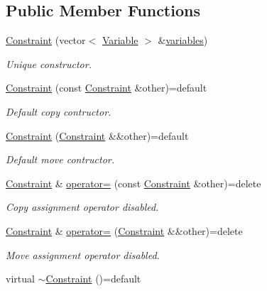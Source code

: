 \subsection*{Public Member Functions}
\begin{DoxyCompactItemize}
\item 
\hyperlink{classghost_1_1Constraint_a5aff0899e4c035709f2198b37d269e3b}{Constraint} (vector$<$ \hyperlink{classghost_1_1Variable}{Variable} $>$ \&\hyperlink{classghost_1_1Constraint_aff0c784579a9d69524be3dc9c0068302}{variables})
\begin{DoxyCompactList}\small\item\em Unique constructor. \end{DoxyCompactList}\item 
\hyperlink{classghost_1_1Constraint_a12f4e85434d02d6fe0a2a95fa7ff6a56}{Constraint} (const \hyperlink{classghost_1_1Constraint}{Constraint} \&other)=default
\begin{DoxyCompactList}\small\item\em Default copy contructor. \end{DoxyCompactList}\item 
\hyperlink{classghost_1_1Constraint_af90f09c362cb7eea3f92ed2814f26f20}{Constraint} (\hyperlink{classghost_1_1Constraint}{Constraint} \&\&other)=default
\begin{DoxyCompactList}\small\item\em Default move contructor. \end{DoxyCompactList}\item 
\hyperlink{classghost_1_1Constraint}{Constraint} \& \hyperlink{classghost_1_1Constraint_a002177e11deecee2db240c9ff4647008}{operator=} (const \hyperlink{classghost_1_1Constraint}{Constraint} \&other)=delete
\begin{DoxyCompactList}\small\item\em Copy assignment operator disabled. \end{DoxyCompactList}\item 
\hyperlink{classghost_1_1Constraint}{Constraint} \& \hyperlink{classghost_1_1Constraint_a2d220b6c65e9c5456bdbc49944a0b52c}{operator=} (\hyperlink{classghost_1_1Constraint}{Constraint} \&\&other)=delete
\begin{DoxyCompactList}\small\item\em Move assignment operator disabled. \end{DoxyCompactList}\item 
virtual \hyperlink{classghost_1_1Constraint_aebea8263c24d0c3a5328c20ee0006f32}{$\sim$\+Constraint} ()=default

\end{DoxyCompactItemize}
